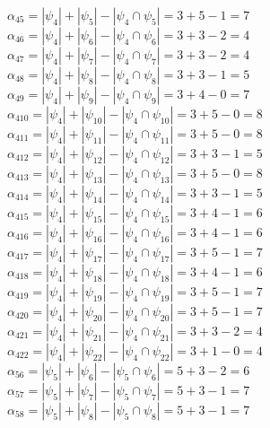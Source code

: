 \documentclass[a4paper,12pt]{article}
\begin{document}
$\alpha_{45} = |\psi_{4}| + |\psi_{5}| - |\psi_{4} \cap \psi_{5}| = 3 + 5 - 1 = 7$\\
$\alpha_{46} = |\psi_{4}| + |\psi_{6}| - |\psi_{4} \cap \psi_{6}| = 3 + 3 - 2 = 4$\\
$\alpha_{47} = |\psi_{4}| + |\psi_{7}| - |\psi_{4} \cap \psi_{7}| = 3 + 3 - 2 = 4$\\
$\alpha_{48} = |\psi_{4}| + |\psi_{8}| - |\psi_{4} \cap \psi_{8}| = 3 + 3 - 1 = 5$\\
$\alpha_{49} = |\psi_{4}| + |\psi_{9}| - |\psi_{4} \cap \psi_{9}| = 3 + 4 - 0 = 7$\\
$\alpha_{410} = |\psi_{4}| + |\psi_{10}| - |\psi_{4} \cap \psi_{10}| = 3 + 5 - 0 = 8$\\
$\alpha_{411} = |\psi_{4}| + |\psi_{11}| - |\psi_{4} \cap \psi_{11}| = 3 + 5 - 0 = 8$\\
$\alpha_{412} = |\psi_{4}| + |\psi_{12}| - |\psi_{4} \cap \psi_{12}| = 3 + 3 - 1 = 5$\\
$\alpha_{413} = |\psi_{4}| + |\psi_{13}| - |\psi_{4} \cap \psi_{13}| = 3 + 5 - 0 = 8$\\
$\alpha_{414} = |\psi_{4}| + |\psi_{14}| - |\psi_{4} \cap \psi_{14}| = 3 + 3 - 1 = 5$\\
$\alpha_{415} = |\psi_{4}| + |\psi_{15}| - |\psi_{4} \cap \psi_{15}| = 3 + 4 - 1 = 6$\\
$\alpha_{416} = |\psi_{4}| + |\psi_{16}| - |\psi_{4} \cap \psi_{16}| = 3 + 4 - 1 = 6$\\
$\alpha_{417} = |\psi_{4}| + |\psi_{17}| - |\psi_{4} \cap \psi_{17}| = 3 + 5 - 1 = 7$\\
$\alpha_{418} = |\psi_{4}| + |\psi_{18}| - |\psi_{4} \cap \psi_{18}| = 3 + 4 - 1 = 6$\\
$\alpha_{419} = |\psi_{4}| + |\psi_{19}| - |\psi_{4} \cap \psi_{19}| = 3 + 5 - 1 = 7$\\
$\alpha_{420} = |\psi_{4}| + |\psi_{20}| - |\psi_{4} \cap \psi_{20}| = 3 + 5 - 1 = 7$\\
$\alpha_{421} = |\psi_{4}| + |\psi_{21}| - |\psi_{4} \cap \psi_{21}| = 3 + 3 - 2 = 4$\\
$\alpha_{422} = |\psi_{4}| + |\psi_{22}| - |\psi_{4} \cap \psi_{22}| = 3 + 1 - 0 = 4$\\
$\alpha_{56} = |\psi_{5}| + |\psi_{6}| - |\psi_{5} \cap \psi_{6}| = 5 + 3 - 2 = 6$\\
$\alpha_{57} = |\psi_{5}| + |\psi_{7}| - |\psi_{5} \cap \psi_{7}| = 5 + 3 - 1 = 7$\\
$\alpha_{58} = |\psi_{5}| + |\psi_{8}| - |\psi_{5} \cap \psi_{8}| = 5 + 3 - 1 = 7$\\
\end{document}

